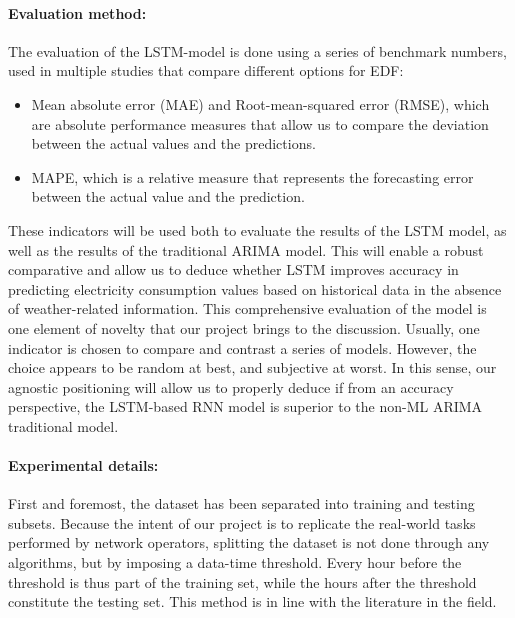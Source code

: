 \documentclass[10pt,twocolumn,letterpaper]{article}
\begin{document}
\paragraph{Evaluation method:} 
The evaluation of the LSTM-model is done using a series of benchmark numbers, used in multiple studies that compare different options for EDF:
\begin{itemize}
\item Mean absolute error (MAE) and Root-mean-squared error (RMSE), which are absolute performance measures that allow us to compare the deviation between the actual values and the predictions.
\item MAPE, which is a relative measure that represents the forecasting error between the actual value and the prediction.
\end{itemize}

These indicators will be used both to evaluate the results of the LSTM model, as well as the results of the traditional ARIMA model. This will enable a robust comparative and allow us to deduce whether LSTM improves accuracy in predicting electricity consumption values based on historical data in the absence of weather-related information. This comprehensive evaluation of the model is one element of novelty that our project brings to the discussion. Usually, one indicator is chosen to compare and contrast a series of models. However, the choice appears to be random at best, and subjective at worst. In this sense, our agnostic positioning will allow us to properly deduce if from an accuracy perspective, the LSTM-based RNN model is superior to the non-ML ARIMA traditional model.

\paragraph{Experimental details:} 

First and foremost, the dataset has been separated into training and testing subsets. Because the intent of our project is to replicate the real-world tasks performed by network operators, splitting the dataset is not done through any algorithms, but by imposing a data-time threshold. Every hour before the threshold is thus part of the training set, while the hours after the threshold constitute the testing set. This method is in line with the literature in the field. 
\end{document}
